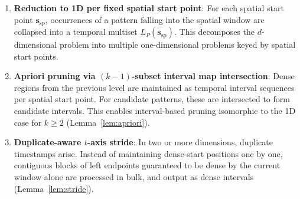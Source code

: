 \begin{enumerate}
\item \textbf{Reduction to 1D per fixed spatial start point}:
For each spatial start point $\bm{s}_{\mathrm{sp}}$,
occurrences of a pattern falling into the spatial window
are collapsed into a temporal multiset
$L_P(\bm{s}_{\mathrm{sp}})$.
This decomposes the $d$-dimensional problem
into multiple one-dimensional problems
keyed by spatial start points.

\item \textbf{Apriori pruning via $(k{-}1)$-subset interval map intersection}:
Dense regions from the previous level are maintained
as temporal interval sequences per spatial start point.
For candidate patterns, these are intersected
to form candidate intervals.
This enables interval-based pruning
isomorphic to the 1D case for $k \geq 2$
(Lemma~\ref{lem:apriori}).

\item \textbf{Duplicate-aware $t$-axis stride}:
In two or more dimensions, duplicate timestamps arise.
Instead of maintaining dense-start positions one by one,
contiguous blocks of left endpoints guaranteed to be dense
by the current window alone are processed in bulk,
and output as dense intervals (Lemma~\ref{lem:stride}).
\end{enumerate}

